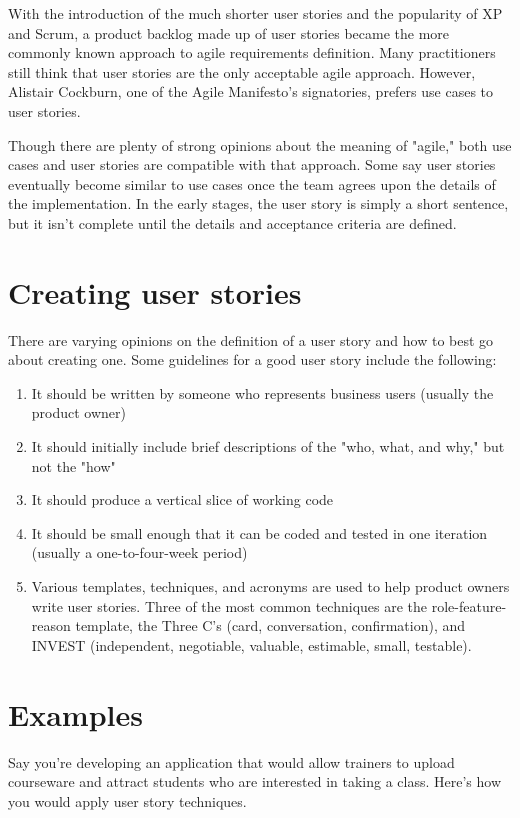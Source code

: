 \item With the introduction of the much shorter user stories and the popularity of XP and Scrum, a product backlog made up of user stories became the more commonly known approach to agile requirements definition. Many practitioners still think that user stories are the only acceptable agile approach. However, Alistair Cockburn, one of the Agile Manifesto's signatories, prefers use cases to user stories.

\item Though there are plenty of strong opinions about the meaning of "agile," both use cases and user stories are compatible with that approach. Some say user stories eventually become similar to use cases once the team agrees upon the details of the implementation. In the early stages, the user story is simply a short sentence, but it isn't complete until the details and acceptance criteria are defined.

\newpage
\section{Creating user stories}
There are varying opinions on the definition of a user story and how to best go about creating one. Some guidelines for a good user story include the following:

\begin{enumerate}
    \item It should be written by someone who represents business users (usually the product owner)
    \item It should initially include brief descriptions of the "who, what, and why," but not the "how"
    \item It should produce a vertical slice of working code  
    \item It should be small enough that it can be coded and tested in one iteration (usually a one-to-four-week period)
    \item Various templates, techniques, and acronyms are used to help product owners write user stories. Three of the most common techniques are the role-feature-reason template, the Three C's (card, conversation, confirmation), and INVEST (independent, negotiable, valuable, estimable, small, testable).    
\end{enumerate}


\section{Examples}
Say you're developing an application that would allow trainers to upload courseware and attract students who are interested in taking a class. Here's how you would apply user story techniques. 

